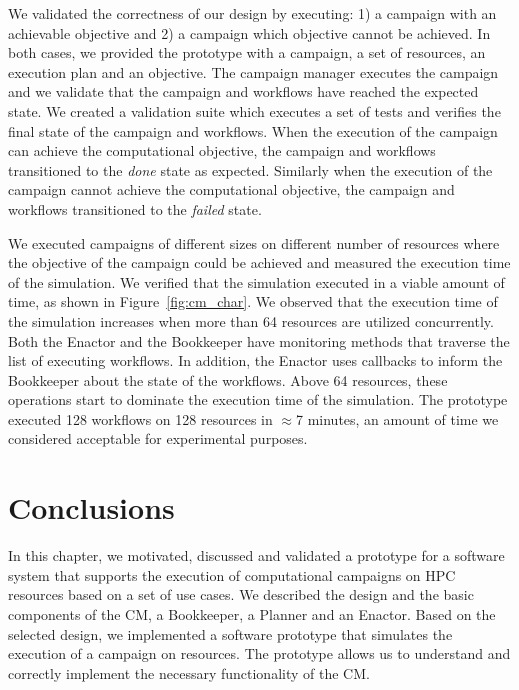 We validated the correctness of our design by executing: 1) a campaign with an
achievable objective and 2) a campaign which objective cannot be achieved. In
both cases, we provided the prototype with a campaign, a set of resources, an
execution plan and an objective. The campaign manager executes the campaign and
we validate that the campaign and workflows have reached the expected state. We
created a validation suite which executes a set of tests and verifies the final
state of the campaign and workflows. When the execution of the campaign can
achieve the computational objective, the campaign and workflows transitioned to
the \textit{done} state as expected. Similarly when the execution of the
campaign cannot achieve the computational objective, the campaign and workflows
transitioned to the \textit{failed} state. 

We executed campaigns of different sizes on different number of resources where
the objective of the campaign could be achieved and measured the execution time 
of the simulation. We verified that the simulation executed in a viable amount 
of time, as shown in Figure~\ref{fig:cm_char}. We observed that the execution 
time of the simulation increases when more than 64 resources are utilized
concurrently. Both the Enactor and the Bookkeeper have monitoring methods that
traverse the list of executing workflows. In addition, the Enactor uses
callbacks to inform the Bookkeeper about the state of the workflows. Above 64
resources, these operations start to dominate the execution time of the
simulation. The prototype executed 128 workflows on 128 resources in
$\approx$7 minutes, an amount of time we considered acceptable for
experimental purposes.






\section{Conclusions}
\label{sec:cm_concl}
In this chapter, we motivated, discussed and validated a prototype for a
software system that supports the execution of computational campaigns on HPC
resources based on a set of use cases. We described the design and the basic
components of the CM, a Bookkeeper, a Planner and an Enactor.
Based on the selected design, we implemented a software prototype that simulates
the execution of a campaign on resources. The prototype allows us to understand
and correctly implement the necessary functionality of the CM.

